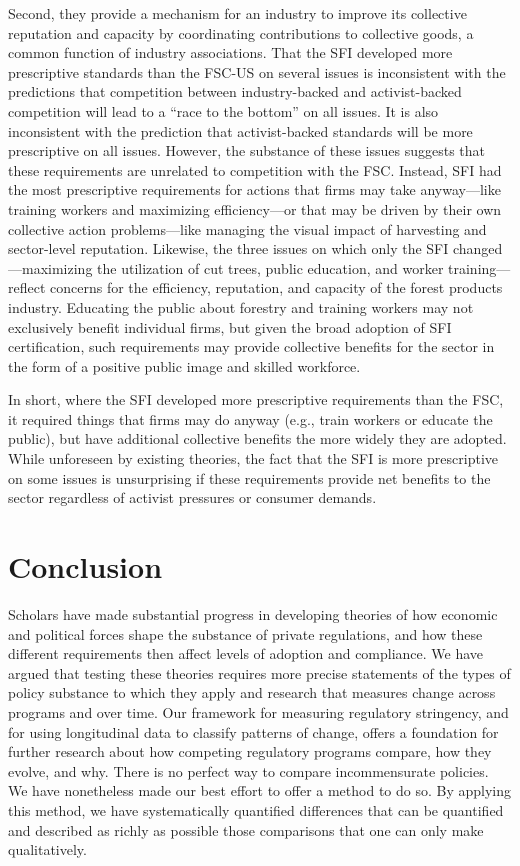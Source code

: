 \documentclass[
      12pt,
            Review ]{article}
\begin{document}
Second, they provide a mechanism for an industry to improve its
collective reputation and capacity by coordinating contributions to
collective goods, a common function of industry associations. That the
SFI developed more prescriptive standards than the FSC-US on several
issues is inconsistent with the predictions that competition between
industry-backed and activist-backed competition will lead to a ``race to
the bottom'' on all issues. It is also inconsistent with the prediction
that activist-backed standards will be more prescriptive on all issues.
However, the substance of these issues suggests that these requirements
are unrelated to competition with the FSC. Instead, SFI had the most
prescriptive requirements for actions that firms may take anyway---like
training workers and maximizing efficiency---or that may be driven by
their own collective action problems---like managing the visual impact
of harvesting and sector-level reputation. Likewise, the three issues on
which only the SFI changed---maximizing the utilization of cut trees,
public education, and worker training---reflect concerns for the
efficiency, reputation, and capacity of the forest products industry.
Educating the public about forestry and training workers may not
exclusively benefit individual firms, but given the broad adoption of
SFI certification, such requirements may provide collective benefits for
the sector in the form of a positive public image and skilled workforce.

In short, where the SFI developed more prescriptive requirements than
the FSC, it required things that firms may do anyway (e.g., train
workers or educate the public), but have additional collective benefits
the more widely they are adopted. While unforeseen by existing theories,
the fact that the SFI is more prescriptive on some issues is
unsurprising if these requirements provide net benefits to the sector
regardless of activist pressures or consumer demands.

\section{Conclusion}\label{conclusion}

Scholars have made substantial progress in developing theories of how
economic and political forces shape the substance of private
regulations, and how these different requirements then affect levels of
adoption and compliance. We have argued that testing these theories
requires more precise statements of the types of policy substance to
which they apply and research that measures change across programs and
over time. Our framework for measuring regulatory stringency, and for
using longitudinal data to classify patterns of change, offers a
foundation for further research about how competing regulatory programs
compare, how they evolve, and why. There is no perfect way to compare
incommensurate policies. We have nonetheless made our best effort to
offer a method to do so. By applying this method, we have systematically
quantified differences that can be quantified and described as richly as
possible those comparisons that one can only make qualitatively.
\end{document}
